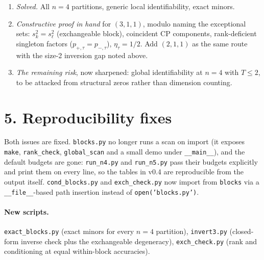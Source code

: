 \documentclass[11pt]{article}
\theoremstyle{remark}
\begin{document}
\begin{enumerate}
\item[(i)] \emph{Solved.} All $n=4$ partitions, generic local identifiability, exact minors.
\item[(iii)] \emph{Constructive proof in hand} for $(3,1,1)$, modulo naming the exceptional sets: $s_k^2=s_\ell^2$ (exchangeable block), coincident CP components, rank-deficient singleton factors ($p_{+,\tau}=p_{-,\tau}$), $\eta_\tau=1/2$. Add $(2,1,1)$ as the same route with the size-2 inversion gap noted above.
\item[(ii)] \emph{The remaining risk}, now sharpened: global identifiability at $n=4$ with $T\le2$, to be attacked from structural zeros rather than dimension counting.
\end{enumerate}

\section*{5. Reproducibility fixes}

Both issues are fixed. \texttt{blocks.py} no longer runs a scan on import (it exposes \texttt{make}, \texttt{rank\_check}, \texttt{global\_scan} and a small demo under \texttt{\_\_main\_\_}), and the default budgets are gone: \texttt{run\_n4.py} and \texttt{run\_n5.py} pass their budgets explicitly and print them on every line, so the tables in v0.4 are reproducible from the output itself. \texttt{cond\_blocks.py} and \texttt{exch\_check.py} now import from \texttt{blocks} via a \texttt{\_\_file\_\_}-based path insertion instead of \texttt{open('blocks.py')}.

\paragraph{New scripts.} \texttt{exact\_blocks.py} (exact minors for every $n=4$ partition), \texttt{invert3.py} (closed-form inverse check plus the exchangeable degeneracy), \texttt{exch\_check.py} (rank and conditioning at equal within-block accuracies).
\end{document}
